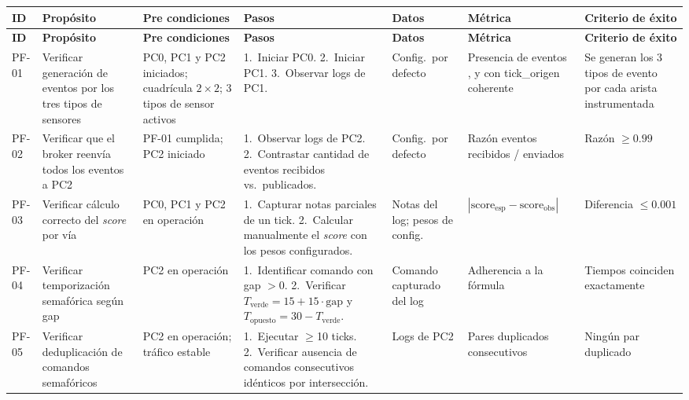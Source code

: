 \documentclass[12pt, a4paper]{article}
\let\oldtexttt\texttt
\renewcommand{\texttt}[1]{\oldtexttt{\seqsplit{#1}}}
\begin{document}
\begin{footnotesize}
\renewcommand{\arraystretch}{1.3}
\setlength{\tabcolsep}{3pt}
\begin{longtable}{|L{0.7cm}|L{2.3cm}|L{2.3cm}|L{2.3cm}|L{2.0cm}|L{2.0cm}|L{2.3cm}|}
\hline
\textbf{ID} & \textbf{Propósito} & \textbf{Pre condiciones} & \textbf{Pasos} & \textbf{Datos} & \textbf{Métrica} & \textbf{Criterio de éxito} \\
\hline
\endfirsthead
\hline
\textbf{ID} & \textbf{Propósito} & \textbf{Pre condiciones} & \textbf{Pasos} & \textbf{Datos} & \textbf{Métrica} & \textbf{Criterio de éxito} \\
\hline
\endhead

PF-01 &
Verificar generación de eventos por los tres tipos de sensores &
PC0, PC1 y PC2 iniciados; cuadrícula $2\!\times\!2$; 3 tipos de sensor activos &
1.~Iniciar PC0. 2.~Iniciar PC1. 3.~Observar logs de PC1. &
Config.\ por defecto &
Presencia de eventos \texttt{camara}, \texttt{espira} y \texttt{gps} con tick\_origen coherente &
Se generan los 3 tipos de evento por cada arista instrumentada \\
\hline

PF-02 &
Verificar que el broker reenvía todos los eventos a PC2 &
PF-01 cumplida; PC2 iniciado &
1.~Observar logs de PC2. 2.~Contrastar cantidad de eventos recibidos vs.\ publicados. &
Config.\ por defecto &
Razón eventos recibidos / enviados &
Razón $\geq 0.99$ \\
\hline

PF-03 &
Verificar cálculo correcto del \textit{score} por vía &
PC0, PC1 y PC2 en operación &
1.~Capturar notas parciales de un tick. 2.~Calcular manualmente el \textit{score} con los pesos configurados. &
Notas del log; pesos de config. &
$|\text{score}_{\text{esp}} - \text{score}_{\text{obs}}|$ &
Diferencia $\leq 0.001$ \\
\hline

PF-04 &
Verificar temporización semafórica según gap &
PC2 en operación &
1.~Identificar comando con gap $> 0$. 2.~Verificar $T_{\text{verde}} = 15 + 15 \cdot \text{gap}$ y $T_{\text{opuesto}} = 30 - T_{\text{verde}}$. &
Comando capturado del log &
Adherencia a la fórmula &
Tiempos coinciden exactamente \\
\hline

PF-05 &
Verificar deduplicación de comandos semafóricos &
PC2 en operación; tráfico estable &
1.~Ejecutar $\geq$10 ticks. 2.~Verificar ausencia de comandos consecutivos idénticos por intersección. &
Logs de PC2 &
Pares duplicados consecutivos &
Ningún par duplicado \\
\hline


\end{longtable}
\end{footnotesize}
\end{document}
